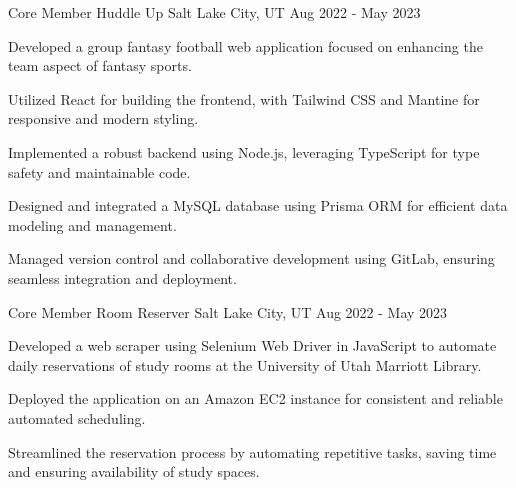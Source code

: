 


\begin{cventries}


\cventry
{Core Member} %
{Huddle Up} %
{Salt Lake City, UT} %
{Aug 2022 - May 2023} %
{ %
\begin{cvitems}
\item {Developed a group fantasy football web application focused on enhancing the team aspect of fantasy sports.}
\item {Utilized React for building the frontend, with Tailwind CSS and Mantine for responsive and modern styling.}
\item {Implemented a robust backend using Node.js, leveraging TypeScript for type safety and maintainable code.}
\item {Designed and integrated a MySQL database using Prisma ORM for efficient data modeling and management.}
\item {Managed version control and collaborative development using GitLab, ensuring seamless integration and deployment.}
\end{cvitems}
}


\cventry
{Core Member} %
{Room Reserver} %
{Salt Lake City, UT} %
{Aug 2022 - May 2023} %
{ %
\begin{cvitems}
\item {Developed a web scraper using Selenium Web Driver in JavaScript to automate daily reservations of study rooms at the University of Utah Marriott Library.}
\item {Deployed the application on an Amazon EC2 instance for consistent and reliable automated scheduling.}
\item {Streamlined the reservation process by automating repetitive tasks, saving time and ensuring availability of study spaces.}
\end{cvitems}
}


\end{cventries}
